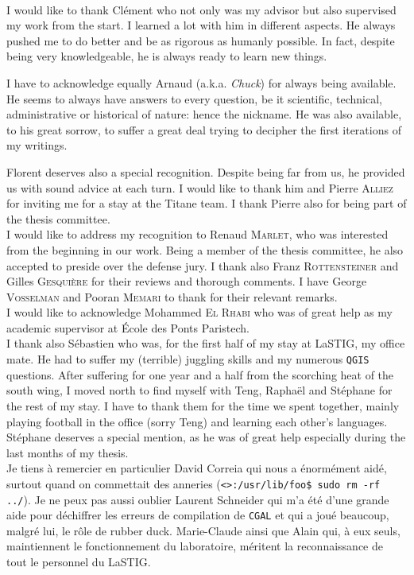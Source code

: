 ~\\

I would like to thank Clément who not only was my advisor but also supervised my work from the start.
I learned a lot with him in different aspects.
He always pushed me to do better and be as rigorous as humanly possible.
In fact, despite being very knowledgeable, he is always ready to learn new things.

I have to acknowledge equally Arnaud (a.k.a. \textit{Chuck}) for always being available.
He seems to always have answers to every question, be it scientific, technical, administrative or historical of nature: hence the nickname.
He was also available, to his great sorrow, to suffer a great deal trying to decipher the first iterations of my writings.

Florent deserves also a special recognition.
Despite being far from us, he provided us with sound advice at each turn.
I would like to thank him and Pierre \textsc{Alliez} for inviting me for a stay at the Titane team.
I thank Pierre also for being part of the thesis committee.\\

I would like to address my recognition to Renaud \textsc{Marlet}, who was interested from the beginning in our work.
Being a member of the thesis committee, he also accepted to preside over the defense jury.
I thank also Franz \textsc{Rottensteiner} and Gilles \textsc{Gesquière} for their reviews and thorough comments.
I have George \textsc{Vosselman} and Pooran \textsc{Memari} to thank for their relevant remarks.\\

I would like to acknowledge Mohammed \textsc{El Rhabi} who was of great help as my academic supervisor at \'Ecole des Ponts Paristech.\\

I thank also Sébastien who was, for the first half of my stay at LaSTIG, my office mate.
He had to suffer my (terrible) juggling skills and my numerous \verb!QGIS! questions.
After suffering for one year and a half from the scorching heat of the south wing, I moved north to find myself with Teng, Raphaël and Stéphane for the rest of my stay.
I have to thank them for the time we spent together, mainly playing football in the office (sorry Teng) and learning each other's languages.
Stéphane deserves a special mention, as he was of great help especially during the last months of my thesis.\\

Je tiens à remercier en particulier David Correia qui nous a énormément aidé, surtout quand on commettait des anneries (\verb!<>:/usr/lib/foo$ sudo rm -rf ../!).
Je ne peux pas aussi oublier Laurent Schneider qui m'a été d'une grande aide pour déchiffrer les erreurs de compilation de \verb!CGAL! et qui a joué beaucoup, malgré lui, le rôle de rubber duck.
Marie-Claude ainsi que Alain qui, à eux seuls, maintiennent le fonctionnement du laboratoire, méritent la reconnaissance de tout le personnel du LaSTIG.\\


